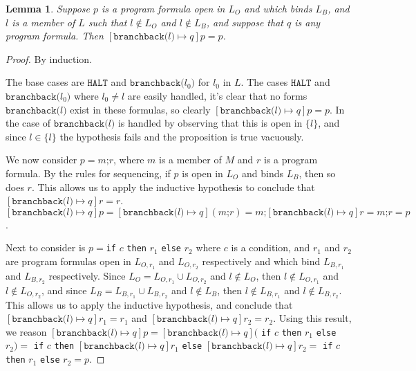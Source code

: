 \documentclass[11pt]{article}
\begin{document}
\newtheorem*{substnoop}{Lemma}
\begin{substnoop}
Suppose $p$ is a program formula open in $L_{O}$ and which binds $L_{B}$, and $l$ is a member of $L$ such that $l \notin L_{O}$ and $l \notin L_{B}$, and suppose that $q$ is any program formula.  Then $[\texttt{branchback(}l\texttt{)} \mapsto q]p = p$.
\end{substnoop}
\begin{proof}
By induction.

The base cases are $\texttt{HALT}$ and $\texttt{branchback(}l_0\texttt{)}$ for $l_0$ in $L$. The cases $\texttt{HALT}$ and $\texttt{branchback(}l_0\texttt{)}$ where $l_0 \neq l$ are easily handled, it's clear that no forms $\texttt{branchback(}l\texttt{)}$ exist in these formulas, so clearly $[\texttt{branchback(}l\texttt{)} \mapsto q]p = p$.  In the case of $\texttt{branchback(}l\texttt{)}$ is handled by observing that this is open in $\{l\}$, and since $l \in \{l\}$ the hypothesis fails and the proposition is true vacuously.

We now consider $p = m\texttt{;}r$, where $m$ is a member of $M$ and $r$ is a program formula.  By the rules for sequencing, if $p$ is open in $L_{O}$ and binds $L_{B}$, then so does $r$.  This allows us to apply the inductive hypothesis to conclude that $[\texttt{branchback(}l\texttt{)} \mapsto q]r = r$.  $[\texttt{branchback(}l\texttt{)} \mapsto q]p = [\texttt{branchback(}l\texttt{)} \mapsto q](m\texttt{;}r) = m\texttt{;}[\texttt{branchback(}l\texttt{)} \mapsto q]r = m\texttt{;}r = p$.

Next to consider is $p = $\texttt{if} $c$ \texttt{then} $r_{1}$ \texttt{else} $r_{2}$ where $c$ is a condition, and $r_{1}$ and $r_{2}$ are program formulas open in $L_{O,r_{1}}$ and $L_{O,r_{2}}$ respectively and which bind $L_{B,r_{1}}$ and $L_{B,r_{2}}$ respectively.  Since $L_{O} = L_{O,r_{1}} \cup L_{O,r_{2}}$ and $l \notin L_{O}$, then $l \notin L_{O,r_{1}}$ and $l \notin L_{O,r_{2}}$, and since $L_{B} = L_{B,r_{1}} \cup L_{B,r_{2}}$ and $l \notin L_{B}$, then $l \notin L_{B,r_{1}}$ and $l \notin L_{B,r_{2}}$.  This allows us to apply the inductive hypothesis, and conclude that $[\texttt{branchback(}l\texttt{)} \mapsto q]r_{1} = r_{1}$ and $[\texttt{branchback(}l\texttt{)} \mapsto q]r_{2} = r_{2}$.  Using this result, we reason $[\texttt{branchback(}l\texttt{)} \mapsto q]p = [\texttt{branchback(}l\texttt{)} \mapsto q]($ \texttt{if} $c$ \texttt{then} $r_{1}$ \texttt{else} $r_{2}) = $ \texttt{if} $c$ \texttt{then} $[\texttt{branchback(}l\texttt{)} \mapsto q]r_{1}$ \texttt{else} $[\texttt{branchback(}l\texttt{)} \mapsto q]r_{2} = $ \texttt{if} $c$ \texttt{then} $r_{1}$ \texttt{else} $r_{2} = p$.


\end{proof}
\end{document}
